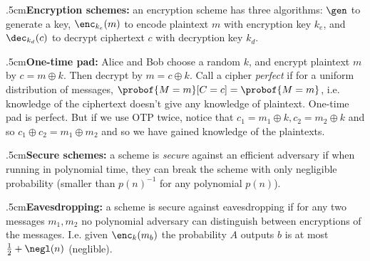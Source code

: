 \quitvmode\kern.5cm{\bf Encryption schemes:} an encryption scheme has three algorithms: $\gen$ to generate a key, $\enc_{k_e}(m)$ to encode plaintext $m$ with encryption key $k_e$, and $\dec_{k_d}(c)$ to
decrypt ciphertext $c$ with decryption key $k_d$.

\quitvmode\kern.5cm{\bf One-time pad:} Alice and Bob choose a random $k$, and encrypt plaintext $m$ by $c=m\oplus k$.
Then decrypt by $m=c\oplus k$.
Call a cipher {\it perfect} if for a uniform distribution of messages, $\probof{M=m}[C=c]=\probof{M=m}$, i.e. knowledge of the ciphertext doesn't give any knowledge of plaintext.
One-time pad is perfect.
But if we use OTP twice, notice that $c_1=m_1\oplus k,c_2=m_2\oplus k$ and so $c_1\oplus c_2=m_1\oplus m_2$ and so we have gained knowledge of the plaintexts.

\quitvmode\kern.5cm{\bf Secure schemes:} a scheme is {\it secure} against an efficient adversary if when running in polynomial time, they can break the scheme with only negligible probability (smaller than
$p(n)^{-1}$ for any polynomial $p(n)$).

\quitvmode\kern.5cm{\bf Eavesdropping:} a scheme is secure against eavesdropping if for any two messages $m_1,m_2$ no polynomial adversary can distinguish between encryptions of the messages.
I.e. given $\enc_k(m_b)$ the probability $A$ outputs $b$ is at most $\frac12+\negl(n)$ (neglible).

\bye

